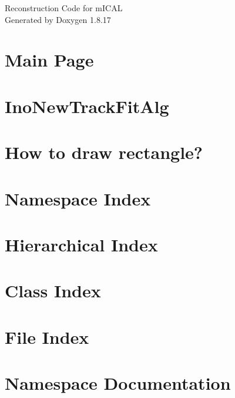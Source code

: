 \let\mypdfximage\pdfximage\def\pdfximage{\immediate\mypdfximage}\documentclass[twoside]{book}
\newcommand{\+}{\discretionary{\mbox{\scriptsize$\hookleftarrow$}}{}{}}
\newcommand{\clearemptydoublepage}{%
  \newpage{\pagestyle{empty}\cleardoublepage}%
}
\begin{document}
\hypersetup{pageanchor=false,
             bookmarksnumbered=true,
             pdfencoding=unicode
            }
\begin{titlepage}
\vspace*{7cm}
\begin{center}%
{\Large Reconstruction Code for m\+I\+C\+AL }\\
\vspace*{1cm}
{\large Generated by Doxygen 1.8.17}\\
\end{center}
\end{titlepage}
\clearemptydoublepage
{}
\tableofcontents
\clearemptydoublepage
{}
\hypersetup{pageanchor=true}

\chapter{Main Page}
\label{index}\hypertarget{index}{}
\chapter{Ino\+New\+Track\+Fit\+Alg}
\label{InoNewTrackFitAlg}

\chapter{How to draw rectangle?}
\label{drawingRectanglePage}

\chapter{Namespace Index}

\chapter{Hierarchical Index}

\chapter{Class Index}

\chapter{File Index}

\chapter{Namespace Documentation}


\end{document}
